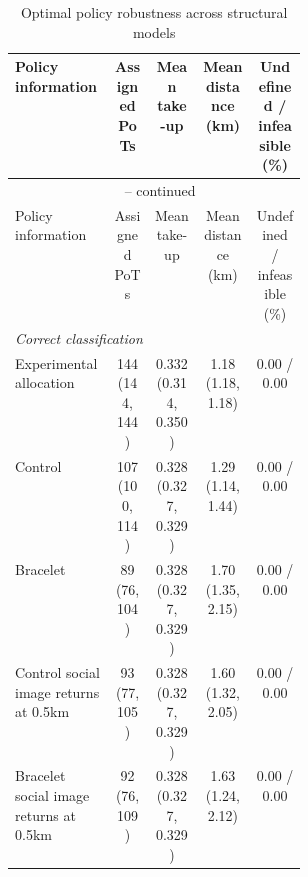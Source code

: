 \small
\begin{longtable}{p{0.34\linewidth}cccc}
\caption{Optimal policy robustness across structural models}\label{tab:policy-model-robustness}\\
\toprule
Policy information & \makecell{Assigned\\PoTs} & \makecell{Mean\\take-up} & \makecell{Mean distance\\(km)} & \makecell{Undefined /\\infeasible (\%)} \\
\midrule
\endfirsthead
\multicolumn{5}{c}{\tablename\ \thetable{} -- continued} \\
\toprule
Policy information & \makecell{Assigned\\PoTs} & \makecell{Mean\\take-up} & \makecell{Mean distance\\(km)} & \makecell{Undefined /\\infeasible (\%)} \\
\midrule
\endhead
\multicolumn{5}{l}{\textit{Correct classification}} \\
Experimental allocation & \makecell[c]{144\\(144, 144)} & \makecell[c]{0.332\\(0.314, 0.350)} & \makecell[c]{1.18\\(1.18, 1.18)} & 0.00 / 0.00 \\
Control & \makecell[c]{107\\(100, 114)} & \makecell[c]{0.328\\(0.327, 0.329)} & \makecell[c]{1.29\\(1.14, 1.44)} & 0.00 / 0.00 \\
Bracelet & \makecell[c]{89\\(76, 104)} & \makecell[c]{0.328\\(0.327, 0.329)} & \makecell[c]{1.70\\(1.35, 2.15)} & 0.00 / 0.00 \\
Control social image returns at 0.5km & \makecell[c]{93\\(77, 105)} & \makecell[c]{0.328\\(0.327, 0.329)} & \makecell[c]{1.60\\(1.32, 2.05)} & 0.00 / 0.00 \\
Bracelet social image returns at 0.5km & \makecell[c]{92\\(76, 109)} & \makecell[c]{0.328\\(0.327, 0.329)} & \makecell[c]{1.63\\(1.24, 2.12)} & 0.00 / 0.00 \\

\end{longtable}
